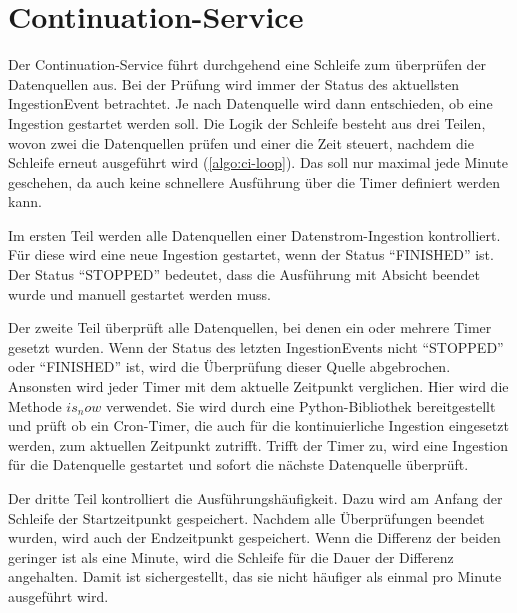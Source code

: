 \section{Continuation-Service}

Der Continuation-Service führt durchgehend eine Schleife zum überprüfen der Datenquellen aus.
Bei der Prüfung wird immer der Status des aktuellsten IngestionEvent betrachtet.
Je nach Datenquelle wird dann entschieden, ob eine Ingestion gestartet werden soll.
Die Logik der Schleife besteht aus drei Teilen, wovon zwei die Datenquellen prüfen und einer die Zeit steuert, nachdem die Schleife erneut ausgeführt wird (\cref{algo:ci-loop}).
Das soll nur maximal jede Minute geschehen, da auch keine schnellere Ausführung über die Timer definiert werden kann.

Im ersten Teil werden alle Datenquellen einer Datenstrom-Ingestion kontrolliert.
Für diese wird eine neue Ingestion gestartet, wenn der Status "`FINISHED"' ist.
Der Status "`STOPPED"' bedeutet, dass die Ausführung mit Absicht beendet wurde und manuell gestartet werden muss.

Der zweite Teil überprüft alle Datenquellen, bei denen ein oder mehrere Timer gesetzt wurden.
Wenn der Status des letzten IngestionEvents nicht "`STOPPED"' oder "`FINISHED"' ist, wird die Überprüfung dieser Quelle abgebrochen.
Ansonsten wird jeder Timer mit dem aktuelle Zeitpunkt verglichen.
Hier wird die Methode $is_now$ verwendet.
Sie wird durch eine Python-Bibliothek bereitgestellt und prüft ob ein Cron-Timer, die auch für die kontinuierliche Ingestion eingesetzt werden, zum aktuellen Zeitpunkt zutrifft.
Trifft der Timer zu, wird eine Ingestion für die Datenquelle gestartet und sofort die nächste Datenquelle überprüft.

Der dritte Teil kontrolliert die Ausführungshäufigkeit.
Dazu wird am Anfang der Schleife der Startzeitpunkt gespeichert.
Nachdem alle Überprüfungen beendet wurden, wird auch der Endzeitpunkt gespeichert.
Wenn die Differenz der beiden geringer ist als eine Minute, wird die Schleife für die Dauer der Differenz angehalten.
Damit ist sichergestellt, das sie nicht häufiger als einmal pro Minute ausgeführt wird.

